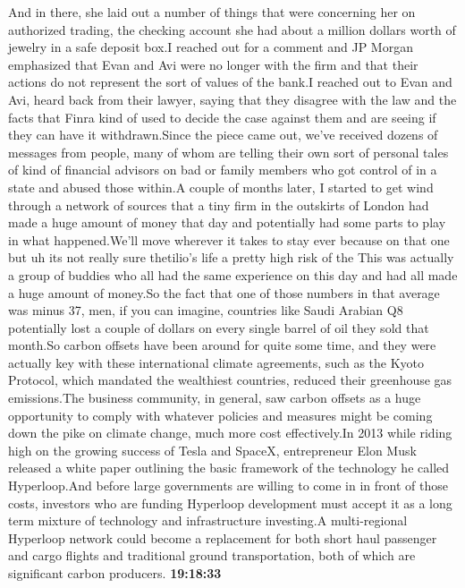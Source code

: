 \documentclass{article}%
\begin{document}
And in there, she laid out a number of things that were concerning her on authorized trading, the checking account she had about a million dollars worth of jewelry in a safe deposit box.I reached out for a comment and JP Morgan emphasized that Evan and Avi were no longer with the firm and that their actions do not represent the sort of values of the bank.I reached out to Evan and Avi, heard back from their lawyer, saying that they disagree with the law and the facts that Finra kind of used to decide the case against them and are seeing if they can have it withdrawn.Since the piece came out, we've received dozens of messages from people, many of whom are telling their own sort of personal tales of kind of financial advisors on bad or family members who got control of in a state and abused those within.A couple of months later, I started to get wind through a network of sources that a tiny firm in the outskirts of London had made a huge amount of money that day and potentially had some parts to play in what happened.We'll move wherever it takes to stay ever because on that one but uh its not really sure thetilio's life a pretty high risk of the  This was actually a group of buddies who all had the same experience on this day and had all made a huge amount of money.So the fact that one of those numbers in that average was minus 37, men, if you can imagine, countries like Saudi Arabian Q8 potentially lost a couple of dollars on every single barrel of oil they sold that month.So carbon offsets have been around for quite some time, and they were actually key with these international climate agreements, such as the Kyoto Protocol, which mandated the wealthiest countries, reduced their greenhouse gas emissions.The business community, in general, saw carbon offsets as a huge opportunity to comply with whatever policies and measures might be coming down the pike on climate change, much more cost effectively.In 2013 while riding high on the growing success of Tesla and SpaceX, entrepreneur Elon Musk released a white paper outlining the basic framework of the technology he called Hyperloop.And before large governments are willing to come in in front of those costs, investors who are funding Hyperloop development must accept it as a long term mixture of technology and infrastructure investing.A multi{-}regional Hyperloop network could become a replacement for both short haul passenger and cargo flights and traditional ground transportation, both of which are significant carbon producers.%
\textbf{19:18:33}%
\newline%
\end{document}
